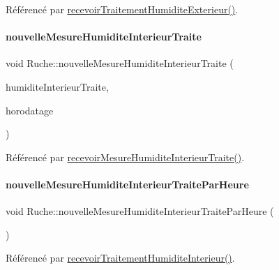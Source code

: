 Référencé par \hyperlink{class_ruche_a59e89246b484d7b63851c0ebd20af6c5}{recevoir\+Traitement\+Humidite\+Exterieur()}.

\mbox{\label{class_ruche_abb16e6c9eef6640a3a216f856cf8d0f5}} 
\paragraph{\texorpdfstring{nouvelle\+Mesure\+Humidite\+Interieur\+Traite}{nouvelleMesureHumiditeInterieurTraite}}
{\footnotesize\ttfamily void Ruche\+::nouvelle\+Mesure\+Humidite\+Interieur\+Traite (\begin{DoxyParamCaption}\item[{double}]{humidite\+Interieur\+Traite,  }\item[{Q\+String}]{horodatage }\end{DoxyParamCaption})\hspace{0.3cm}{\ttfamily [signal]}}



Référencé par \hyperlink{class_ruche_aab8b4958b32aad9af790963903e4788e}{recevoir\+Mesure\+Humidite\+Interieur\+Traite()}.

\mbox{\label{class_ruche_a02a3e68fd11b208507867ebd0e8dbdc2}} 
\paragraph{\texorpdfstring{nouvelle\+Mesure\+Humidite\+Interieur\+Traite\+Par\+Heure}{nouvelleMesureHumiditeInterieurTraiteParHeure}}
{\footnotesize\ttfamily void Ruche\+::nouvelle\+Mesure\+Humidite\+Interieur\+Traite\+Par\+Heure (\begin{DoxyParamCaption}{ }\end{DoxyParamCaption})\hspace{0.3cm}{\ttfamily [signal]}}



Référencé par \hyperlink{class_ruche_a6d4c59f2850f803a0ed1946e737b4262}{recevoir\+Traitement\+Humidite\+Interieur()}.

